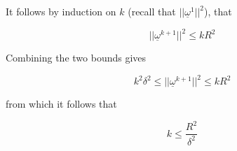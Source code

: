 \documentclass[12pt]{article}
\begin{document}
It follows by induction on $k$ (recall that $||\underline
{\omega}^1||^2$), that

\begin{equation*}
||\underline {\omega}^{k+1}||^2 \le k R^2
\end{equation*}

Combining the two bounds gives

\begin{equation*}
k^2 \delta^2 \le ||\underline {\omega}^{k+1}||^2 \le k R^2
\end{equation*}

from which it follows that

\begin{equation*}
k \le \frac{R^2} {\delta^2}
\end{equation*}
\end{document}
